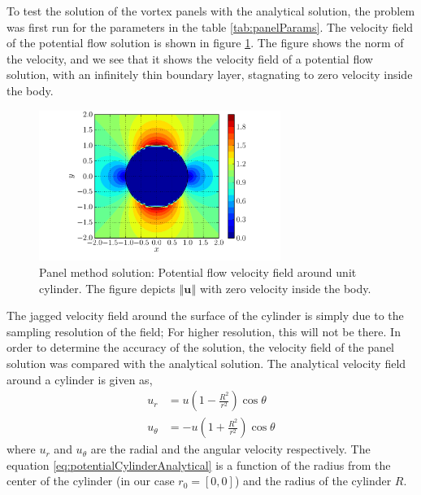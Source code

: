 To test the solution of the vortex panels with the analytical solution, the problem was first run for the parameters in the table \ref{tab:panelParams}. The velocity field of the potential flow solution is shown in figure \ref{fig:panelCylinder_velocityField}. The figure shows the norm of the velocity, and we see that it shows the velocity field of a potential flow solution, with an infinitely thin boundary layer, stagnating to zero velocity inside the body.

	\begin{figure}[t]
	\centering
	\includegraphics[width=0.7\textwidth]{figures/lagrangian/panelCylinder_velocityField.pdf}
	\caption{Panel method solution: Potential flow velocity field around unit cylinder. The figure depicts $\left\Vert\mathbf{u}\right\Vert$ with zero velocity inside the body.}
	\label{fig:panelCylinder_velocityField}
	\end{figure}

The jagged velocity field around the surface of the cylinder is simply due to the sampling resolution of the field; For higher resolution, this will not be there. In order to determine the accuracy of the solution, the velocity field of the panel solution was compared with the analytical solution. The analytical velocity field around a cylinder is given as,
	\begin{subequations}
	\begin{align}
	u_r &= u\left(1 - \frac{R^2}{r^2}\right)\cos\theta\\
	u_{\theta} &= -u\left(1+\frac{R^2}{r^2}\right)\cos\theta
	\end{align}
	\label{eq:potentialCylinderAnalytical}
	\end{subequations}	
where $u_r$ and $u_{\theta}$ are the radial and the angular velocity respectively. The equation \ref{eq:potentialCylinderAnalytical} is a function of the radius from the center of the cylinder (in our case $r_0 = [0, 0]$) and the radius of the cylinder $R$. 

